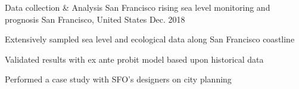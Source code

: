 \begin{cventries}
  \cventry
    {Data collection \& Analysis}
    {San Francisco rising sea level monitoring and prognosis}
    {San Francisco, United States}
    {Dec. 2018}
    {
      \begin{cvitems}
        \item {Extensively sampled sea level and ecological data along San Francisco coastline}
        \item {Validated results with ex ante probit model based upon historical data}
        \item {Performed a case study with SFO's designers on city planning}
      \end{cvitems}
    }
\end{cventries}
